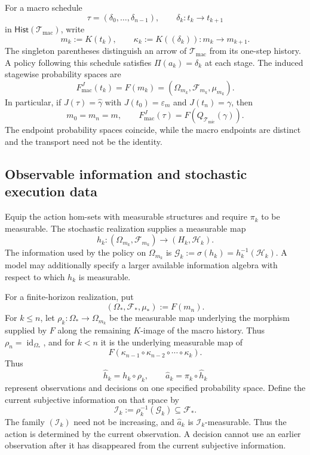 \documentclass[11pt,a4paper]{article}
\newcommand{\Hist}{\mathsf{Hist}}
\newcommand{\id}{\operatorname{id}}
\newcommand{\Tmic}{\mathcal T_{\mathrm{mic}}}
\newcommand{\Tmac}{\mathcal T_{\mathrm{mac}}}
\begin{document}
For a macro schedule
\[
    \tau=(\delta_0,\ldots,\delta_{n-1}),
    \qquad \delta_k:t_k\longrightarrow t_{k+1}
\]
in $\Hist(\Tmac)$,
write
\[
    m_k:=K(t_k),\qquad
    \kappa_k:=K((\delta_k)):m_k\longrightarrow m_{k+1}.
\]
The singleton parentheses distinguish an arrow of $\Tmac$ from its
one-step history. A policy following this schedule satisfies
$\Pi(a_k)=\delta_k$ at each stage.
The induced stagewise probability spaces are
\[
    F_{\mathrm{mac}}^J(t_k)=F(m_k)
       =(\Omega_{m_k},\mathcal F_{m_k},\mu_{m_k}).
\]
In particular, if $J(\tau)=\widehat\gamma$ with
$J(t_0)=\varepsilon_m$ and $J(t_n)=\gamma$, then
\[
    m_0=m_n=m,\qquad
    F_{\mathrm{mac}}^J(\tau)=F(Q_{\Tmic}(\gamma)).
\]
The endpoint probability spaces coincide, while the macro endpoints are
distinct and the transport need not be the identity.

\subsection{Observable information and stochastic execution data}

Equip the action hom-sets with measurable structures and require $\pi_k$
to be measurable. The stochastic realization supplies a measurable map
\[
  h_k:(\Omega_{m_k},\mathcal F_{m_k})\longrightarrow(H_k,\mathcal H_k).
\]
The information used by the policy on $\Omega_{m_k}$ is
$\mathcal G_k:=\sigma(h_k)=h_k^{-1}(\mathcal H_k)$.
A model may additionally specify a larger available information algebra
with respect to which $h_k$ is measurable.

For a finite-horizon realization, put
\[
   (\Omega_*,\mathcal F_*,\mu_*):=F(m_n).
\]
For $k\leq n$, let $\rho_k:\Omega_*\to\Omega_{m_k}$ be the measurable
map underlying the morphism supplied by $F$ along the remaining $K$-image
of the macro history. Thus $\rho_n=\id_{\Omega_*}$, and for $k<n$ it is
the underlying measurable map of
\[
F(\kappa_{n-1}\circ\kappa_{n-2}\circ\cdots\circ\kappa_k).
\]
Thus
\[
    \widehat h_k=h_k\circ\rho_k,
    \qquad \widehat a_k=\pi_k\circ\widehat h_k
\]
represent observations and decisions on one specified probability space.
Define the current subjective information on that space by
\[
  \mathcal I_k:=\rho_k^{-1}(\mathcal G_k)\subseteq\mathcal F_*.
\]
The family $(\mathcal I_k)$ need not be increasing, and
$\widehat a_k$ is $\mathcal I_k$-measurable. Thus the action is determined by the current observation. A decision cannot use
an earlier observation after it has disappeared from the current subjective
information.
\end{document}
